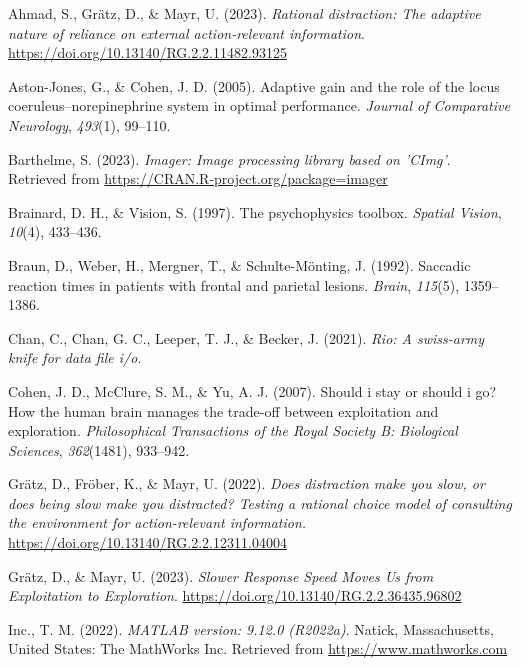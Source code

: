 \documentclass[
  man,floatsintext]{apa6}
\newlength{\cslhangindent}
\newlength{\cslentryspacingunit} %
\newenvironment{CSLReferences}[2] %
 {%
  \setlength{\parindent}{0pt}
  \ifodd #1
  \let\oldpar\par
  \def\par{\hangindent=\cslhangindent\oldpar}
  \fi
  \setlength{\parskip}{#2\cslentryspacingunit}
 }%
 {}
\begin{document}
\hypertarget{refs}{}
\begin{CSLReferences}{1}{0}
\leavevmode{}%
Ahmad, S., Grätz, D., \& Mayr, U. (2023). \emph{Rational distraction: {The} adaptive nature of reliance on external action-relevant information}. \url{https://doi.org/10.13140/RG.2.2.11482.93125}

\leavevmode{}%
Aston-Jones, G., \& Cohen, J. D. (2005). Adaptive gain and the role of the locus coeruleus--norepinephrine system in optimal performance. \emph{Journal of Comparative Neurology}, \emph{493}(1), 99--110.

\leavevmode{}%
Barthelme, S. (2023). \emph{Imager: Image processing library based on 'CImg'}. Retrieved from \url{https://CRAN.R-project.org/package=imager}

\leavevmode{}%
Brainard, D. H., \& Vision, S. (1997). The psychophysics toolbox. \emph{Spatial Vision}, \emph{10}(4), 433--436.

\leavevmode{}%
Braun, D., Weber, H., Mergner, T., \& Schulte-Mönting, J. (1992). Saccadic reaction times in patients with frontal and parietal lesions. \emph{Brain}, \emph{115}(5), 1359--1386.

\leavevmode{}%
Chan, C., Chan, G. C., Leeper, T. J., \& Becker, J. (2021). \emph{Rio: A swiss-army knife for data file i/o}.

\leavevmode{}%
Cohen, J. D., McClure, S. M., \& Yu, A. J. (2007). Should i stay or should i go? How the human brain manages the trade-off between exploitation and exploration. \emph{Philosophical Transactions of the Royal Society B: Biological Sciences}, \emph{362}(1481), 933--942.

\leavevmode{}%
Grätz, D., Fröber, K., \& Mayr, U. (2022). \emph{Does distraction make you slow, or does being slow make you distracted? {Testing} a rational choice model of consulting the environment for action-relevant information.} \url{https://doi.org/10.13140/RG.2.2.12311.04004}

\leavevmode{}%
Grätz, D., \& Mayr, U. (2023). \emph{Slower {Response} {Speed} {Moves} {Us} from {Exploitation} to {Exploration}}. \url{https://doi.org/10.13140/RG.2.2.36435.96802}

\leavevmode{}%
Inc., T. M. (2022). \emph{MATLAB version: 9.12.0 (R2022a)}. Natick, Massachusetts, United States: The MathWorks Inc. Retrieved from \url{https://www.mathworks.com}


\end{CSLReferences}
\end{document}
